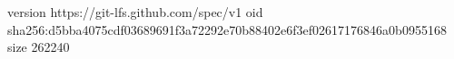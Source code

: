 version https://git-lfs.github.com/spec/v1
oid sha256:d5bba4075cdf03689691f3a72292e70b88402e6f3ef02617176846a0b0955168
size 262240
